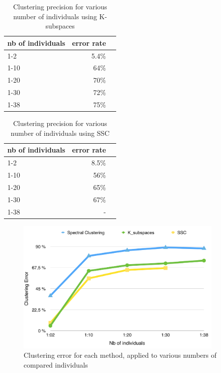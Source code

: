 \documentclass[12pt,a4paper,onecolumn]{article}
\begin{document}
\begin{table}[H]
	\centering
	\begin{tabular}{l|r|r}
		\toprule
		{}    nb of individuals & error rate \\
		\midrule
		1-2                     & 5.4\%      \\
		1-10                    & 64\%       \\
		1-20                    & 70\%       \\
		1-30                    & 72\%       \\
		1-38                    & 75\%       \\
		\bottomrule
	\end{tabular}
	\caption{Clustering precision for various number of individuals using K-subspaces}
\end{table}


\begin{table}[h]
	\centering
	\begin{tabular}{l|r|r}
		\toprule
		{}    nb of individuals & error rate \\
		\midrule
		1-2                     & 8.5\%      \\
		1-10                    & 56\%       \\
		1-20                    & 65\%       \\
		1-30                    & 67\%       \\
		1-38                    & -          \\
		\bottomrule
	\end{tabular}
	\caption{Clustering precision for various number of individuals using SSC}
\end{table}

\begin{figure}[H]
	\centering
	\includegraphics[width = 0.9\textwidth]{nb_individuals.png}
	\caption{Clustering error for each method, applied to various numbers of compared individuals}
	\label{fig_1}
\end{figure}
\end{document}
